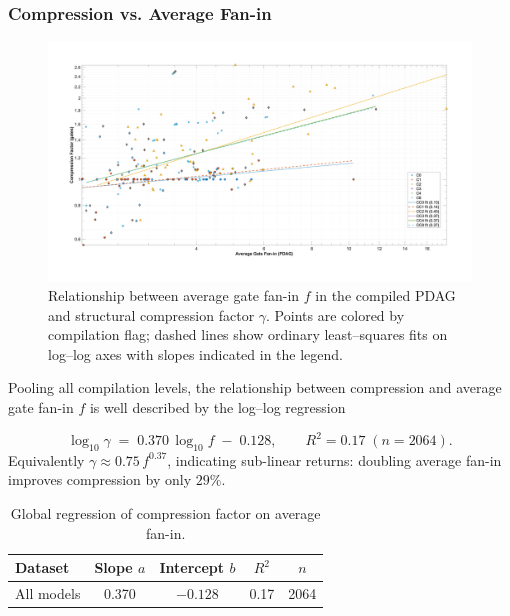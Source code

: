 \subsubsection{Compression vs. Average Fan-in}
\label{sec:kc_micro_fanin}
\begin{landscape}
\begin{figure}[hb]
    \centering
    \includegraphics[width=1.15\textwidth]{figs/compiler/compiler_fanin_vs_compression.png}
    \caption{Relationship between average gate fan-in $f$ in the compiled PDAG and structural compression factor $\gamma$.  Points are colored by compilation flag; dashed lines show ordinary least–squares fits on log--log axes with slopes indicated in the legend.}
    \label{fig:compiler_fanin_compression}
\end{figure}
\end{landscape}

Pooling all compilation levels, the relationship between compression
and average gate fan-in $f$ is well described by the log–log regression

\[
  \log_{10}\gamma \;=\; 0.370\,\log_{10}f \; - \; 0.128,
  \qquad R^{2}=0.17\;(n=2064).
\]
Equivalently
$\gamma\approx0.75\,f^{0.37}$, indicating sub-linear returns: doubling
average fan-in improves compression by only $29\%$.

\begin{table}[t]
  \centering
  \caption{Global regression of compression factor on average fan-in.}
  \label{tab:micro_fanin_global}
  \begin{tabular}{lcccc}
    \toprule
    Dataset & Slope $a$ & Intercept $b$ & $R^{2}$ & $n$ \\
    \midrule
    All models & 0.370 & $-0.128$ & 0.17 & 2064 \\
    \bottomrule
  \end{tabular}
\end{table}

